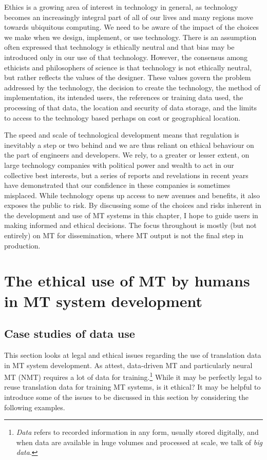 \documentclass[output=paper]{langscibook}
\begin{document}
Ethics is a growing area of interest in technology in general, as technology becomes an increasingly integral part of all of our lives and many regions move towards ubiquitous computing. We need to be aware of the impact of the choices we make when we design, implement, or use technology. There is an assumption often expressed that technology is ethically neutral and that bias may be introduced only in our use of that technology. However, the consensus among ethicists and philosophers of science is that technology is not ethically neutral, but rather reflects the values of the designer. These values govern the problem addressed by the technology, the decision to create the technology, the method of implementation, its intended users, the references or training data used, the processing of that data, the location and security of data storage, and the limits to access to the technology based perhaps on cost or geographical location.

The speed and scale of technological development means that regulation is inevitably a step or two behind and we are thus reliant on ethical behaviour on the part of engineers and developers. We rely, to a greater or lesser extent, on large technology companies with political power and wealth to act in our collective best interests, but a series of reports and revelations in recent years have demonstrated that our confidence in these companies is sometimes misplaced. While technology opens up access to new avenues and benefits, it also exposes the public to risk. By discussing some of the choices and risks inherent in the development and use of MT systems in this chapter, I hope to guide users in making informed and ethical decisions. The focus throughout is mostly (but not entirely) on MT for dissemination, where MT output is not the final step in production.

\section{The ethical use of MT by humans in MT system development}\label{sec:moorkens:2}
\subsection{Case studies of data use}\label{sec:moorkens:2.1}

This section looks at legal and ethical issues regarding the use of translation data in MT system development. As  attest, data-driven MT and particularly neural MT (NMT) requires a lot of data for training.\footnote{\textit{Data} refers to recorded information in any form, usually stored digitally, and when data are available in huge volumes and processed at scale, we talk of \textit{big data}.} While it may be perfectly legal to reuse translation data for training MT systems, is it ethical? It may be helpful to introduce some of the issues to be discussed in this section by considering the following examples.
\end{document}
